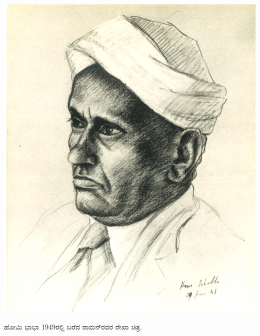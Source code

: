 ~\phantom{-}
\vfill

\thispagestyle{empty}

\begin{center}
\includegraphics{images/raman-homibhabha-sketch.jpg}

\medskip
{\fontsize{12pt}{14pt}\selectfont ಹೋಮಿ ಭಾಭಾ  {\rm 1949}ರಲ್ಲಿ  ಬರೆದ  ರಾಮನ್‍ರವರ ರೇಖಾ ಚಿತ್ರ.}\relax
\end{center}

\vfill\eject
